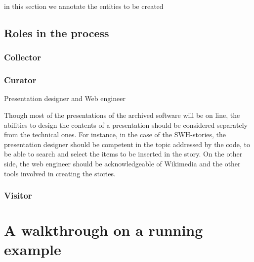 \documentclass[]{article}
\begin{document}
in this section we annotate the entities to be created

\hypertarget{roles-in-the-process}{%
\subsection{Roles in the process}\label{roles-in-the-process}}

\hypertarget{collector}{%
\subsubsection{\texorpdfstring{\textbf{Collector}}{Collector}}\label{collector}}

\hypertarget{curator}{%
\subsubsection{\texorpdfstring{\textbf{Curator}}{Curator}}\label{curator}}

Presentation designer and Web engineer

Though most of the presentations of the archived software will be on
line, the abilities to design the contents of a presentation should be
considered separately from the technical ones. For instance, in the case
of the SWH-stories, the presentation designer should be competent in the
topic addressed by the code, to be able to search and select the items
to be inserted in the story. On the other side, the web engineer should
be acknowledgeable of Wikimedia and the other tools involved in creating
the stories.

\hypertarget{visitor}{%
\subsubsection{\texorpdfstring{\textbf{Visitor}}{Visitor}}\label{visitor}}

\hypertarget{sec:walkthrough}{%
\section{A walkthrough on a running example}\label{sec:walkthrough}}

\printbibliography[title=Bibliography]
\end{document}
